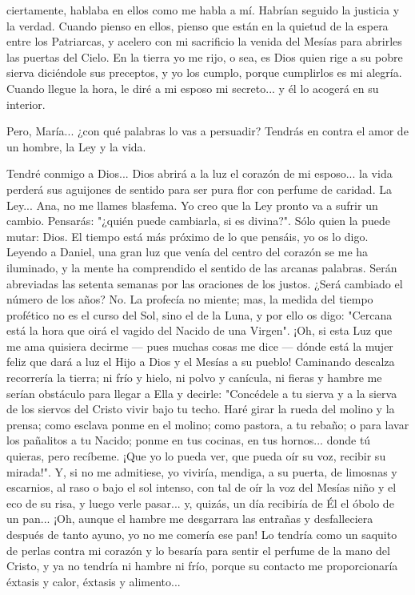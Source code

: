 \documentclass[12pt, twoside, openright]{book} %
\begin{document}
ciertamente, hablaba en ellos como me habla a mí. Habrían seguido la justicia y la verdad. Cuando pienso en ellos, pienso que están en la quietud de la espera entre los Patriarcas, y acelero con mi sacrificio la venida del Mesías para abrirles las puertas del Cielo. En la tierra yo me rijo, o sea, es Dios quien rige a su pobre sierva diciéndole sus preceptos, y yo los cumplo, porque cumplirlos es mi alegría. Cuando llegue la hora, le diré a mi esposo mi secreto... y él lo acogerá en su interior. 

Pero, María... ¿con qué palabras lo vas a persuadir? Tendrás en contra el amor de un hombre, la Ley y la vida. 

Tendré conmigo a Dios... Dios abrirá a la luz el corazón de mi esposo... la vida perderá sus aguijones de sentido para ser pura flor con perfume de caridad. La Ley... Ana, no me llames blasfema. Yo creo que la Ley pronto va a sufrir un cambio. Pensarás: "¿quién puede cambiarla, si es divina?". Sólo quien la puede mutar: Dios. El tiempo está más próximo de lo que pensáis, yo os lo digo. Leyendo a Daniel, una gran luz que venía del centro del corazón se me ha iluminado, y la mente ha comprendido el sentido de las arcanas palabras. Serán abreviadas las setenta semanas por las oraciones de los justos. ¿Será cambiado el número de los años? No. La profecía no miente; mas, la medida del tiempo profético no es el curso del Sol, sino el de la Luna, y por ello os digo: "Cercana está la hora que oirá el vagido del Nacido de una Virgen". ¡Oh, si esta Luz que me ama quisiera decirme — pues muchas cosas me dice — dónde está la mujer feliz que dará a luz el Hijo a Dios y el Mesías a su pueblo! Caminando descalza recorrería la tierra; ni frío y hielo, ni polvo y canícula, ni fieras y hambre me serían obstáculo para llegar a Ella y decirle: "Concédele a tu sierva y a la sierva de los siervos del Cristo vivir bajo tu techo. Haré girar la rueda del molino y la prensa; como esclava ponme en el molino; como pastora, a tu rebaño; o para lavar los pañalitos a tu Nacido; ponme en tus cocinas, en tus hornos... donde tú quieras, pero recíbeme. ¡Que yo lo pueda ver, que pueda oír su voz, recibir su mirada!". Y, si no me admitiese, yo viviría, mendiga, a su puerta, de limosnas y escarnios, al raso o bajo el sol intenso, con tal de oír la voz del Mesías niño y el eco de su risa, y luego verle pasar... y, quizás, un día recibiría de Él el óbolo de un pan... ¡Oh, aunque el hambre me desgarrara las entrañas y desfalleciera después de tanto ayuno, yo no me comería ese pan! Lo tendría como un saquito de perlas contra mi corazón y lo besaría para sentir el perfume de la mano del Cristo, y ya no tendría ni hambre ni frío, porque su contacto me proporcionaría éxtasis y calor, éxtasis y alimento... 
\end{document}
